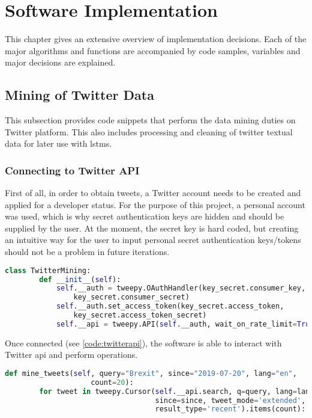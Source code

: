 \section{Software Implementation}

    This chapter gives an extensive overview of implementation decisions. Each of the major algorithms and functions are accompanied by code samples, variables and major decisions are explained.
    
    \subsection{Mining of Twitter Data} \label{twitterdata}
        This subsection provides code snippets that perform the data mining duties on Twitter platform. This also includes processing and cleaning of twitter textual data for later use with \gls{lstm}s.
        
        \subsubsection{Connecting to Twitter API}
            First of all, in order to obtain tweets, a Twitter account needs to be created and applied for a developer status. For the purpose of this project, a personal account was used, which is why secret authentication keys are hidden and should be supplied by the user. At the moment, the secret key is hard coded, but creating an intuitive way for the user to input personal secret authentication keys/tokens should not be a problem in future iterations.
            
            \begin{lstlisting}[language=Python, caption=Connecting Twitter API, label=code:twitterapi]
    class TwitterMining:
        def __init__(self):
            self.__auth = tweepy.OAuthHandler(key_secret.consumer_key, 
                key_secret.consumer_secret)
            self.__auth.set_access_token(key_secret.access_token, 
                key_secret.access_token_secret)
            self.__api = tweepy.API(self.__auth, wait_on_rate_limit=True)
            \end{lstlisting}
            
            Once connected (see \cref{code:twitterapi}), the software is able to interact with Twitter \gls{api} and perform operations.
            
            \begin{lstlisting}[language=Python, caption=Starting Data Mining, label=code:twitterstream]
    def mine_tweets(self, query="Brexit", since="2019-07-20", lang="en", 
                    count=20):
        for tweet in tweepy.Cursor(self.__api.search, q=query, lang=lang, 
                                   since=since, tweet_mode='extended',
                                   result_type='recent').items(count):
            \end{lstlisting}
            
